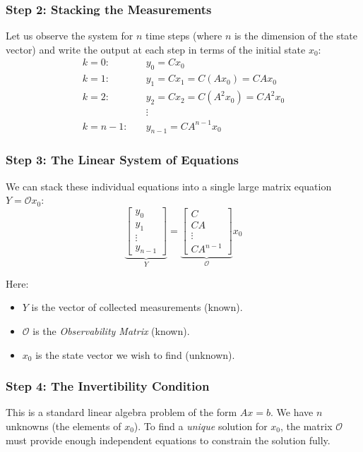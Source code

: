 \subsubsection*{Step 2: Stacking the Measurements}
Let us observe the system for $n$ time steps (where $n$ is the dimension of the state vector) and write the output at each step in terms of the initial state $x_0$:
\begin{align*}
	k=0: & \quad y_0 = C x_0 \\
	k=1: & \quad y_1 = C x_1 = C (A x_0) = CA x_0 \\
	k=2: & \quad y_2 = C x_2 = C (A^2 x_0) = CA^2 x_0 \\
	& \quad \vdots \\
	k=n-1: & \quad y_{n-1} = C A^{n-1} x_0
\end{align*}

\subsubsection*{Step 3: The Linear System of Equations}
We can stack these individual equations into a single large matrix equation $Y = \mathcal{O} x_0$:
\begin{equation*}
	\underbrace{\begin{bmatrix} y_0 \\ y_1 \\ \vdots \\ y_{n-1} \end{bmatrix}}_{{Y}}
	=
	\underbrace{\begin{bmatrix} C \\ CA \\ \vdots \\ CA^{n-1} \end{bmatrix}}_{\mathcal{O}}
	x_0
\end{equation*}

Here:
\begin{itemize}
	\item ${Y}$ is the vector of collected measurements (known).
	\item $\mathcal{O}$ is the \emph{Observability Matrix} (known).
	\item $x_0$ is the state vector we wish to find (unknown).
\end{itemize}

\subsubsection*{Step 4: The Invertibility Condition}
This is a standard linear algebra problem of the form $Ax = b$. We have $n$ unknowns (the elements of $x_0$). To find a \emph{unique} solution for $x_0$, the matrix $\mathcal{O}$ must provide enough independent equations to constrain the solution fully.

